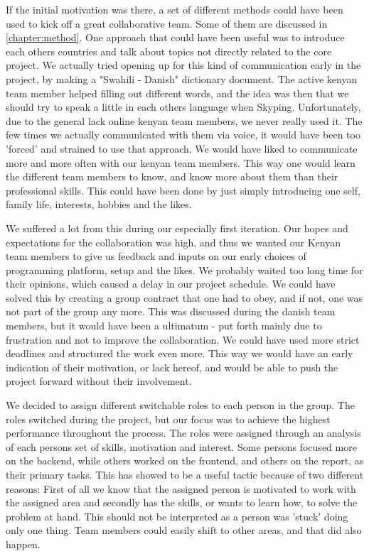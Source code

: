 If the initial motivation was there, a set of different methods could have been used to kick off a great collaborative team. Some of them are discussed in \ref{chapter:method}. One approach that could have been useful was to introduce each others countries and talk about topics not directly related to the core project. We actually tried opening up for this kind of communication early in the project, by making a "Swahili - Danish" dictionary document. The active kenyan team member helped filling out different words, and the idea was then that we should try to speak a little in each others language when Skyping. Unfortunately, due to the general lack online kenyan team members, we never really used it. The few times we actually communicated with them via voice, it would have been too 'forced' and strained to use that approach. We would have liked to communicate more and more often with our kenyan team members. This way one would learn the different team members to know, and know more about them than their professional skills. This could have been done by just simply introducing one self, family life, interests, hobbies and the likes.

We suffered a lot from this during our especially first iteration. Our hopes and expectations for the collaboration was high, and thus we wanted our Kenyan team members to give us feedback and inputs on our early choices of programming platform, setup and the likes. We probably waited too long time for their opinions, which caused a delay in our project schedule. We could have solved this by creating a group contract that one had to obey, and if not, one was not part of the group any more. This was discussed during the danish team members, but it would have been a ultimatum - put forth mainly due to frustration and not to improve the collaboration. We could have used more strict deadlines and structured the work even more. This way we would have an early indication of their motivation, or lack hereof, and would be able to push the project forward without their involvement. 

We decided to assign different switchable roles to each person in the group. The roles switched during the project, but our focus was to achieve the highest performance throughout the process. The roles were assigned through an analysis of each persons set of skills, motivation and interest. Some persons focused more on the backend, while others worked on the frontend, and others on the report, as their primary tasks. This has showed to be a useful tactic because of two different reasons: First of all we know that the assigned person is motivated to work with the assigned area and secondly has the skills, or wants to learn how, to solve the problem at hand. This should not be interpreted as a person was 'stuck' doing only one thing. Team members could easily shift to other areas, and that did also happen.

